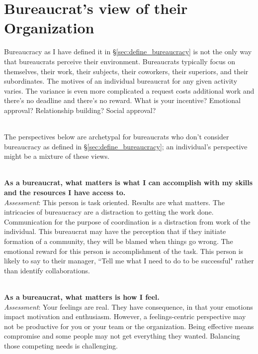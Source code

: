 \section{Bureaucrat's view of their Organization\label{sec:alternative_views_from_within}}

Bureaucracy as I have defined it in \S\ref{sec:define_bureaucracy} is not the only way that bureaucrats perceive their environment. Bureaucrats typically focus on themselves, their work, their subjects, their coworkers, their superiors, and their subordinates. The motives of an individual bureaucrat for any given activity varies. The variance is even more complicated a request costs additional work and there's no deadline and there's no reward. What is your incentive? Emotional approval? Relationship building? Social approval?

\ \\

The perspectives below are archetypal for bureaucrats who don't consider bureaucracy as defined in \S\ref{sec:define_bureaucracy}; an individual's perspective might be a mixture of these views.

\ \\
\textbf{As a bureaucrat, what matters is what I can accomplish with my skills and the resources I have access to.} \\
\textit{Assessment}: This person is task oriented. Results are what matters. The intricacies of bureaucracy are a distraction to getting the work done. 
Communication  for the purpose of coordination is a distraction from work of the individual. 
This bureaucrat may have the perception that if they initiate formation of a community, they will be blamed when things go wrong.
The emotional reward for this person is accomplishment of the task. This person is likely to say to their manager, ``Tell me what I need to do to be successful" rather than identify collaborations.

\ \\
\textbf{As a bureaucrat, what matters is how I feel.} \\
\textit{Assessment}: Your feelings are real. They have consequence, in that your emotions impact motivation and enthusiasm. However, a feelings-centric perspective may not be productive for you or your team or the organization. Being effective means compromise and some people may not get everything they wanted. Balancing those competing needs is challenging.

